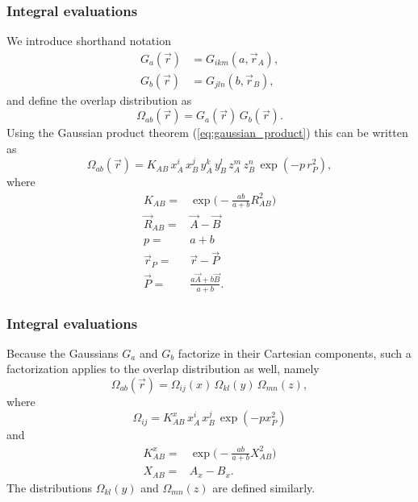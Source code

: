 \frame
{
  \frametitle{Integral evaluations}
\begin{small}
{\scriptsize
We introduce  shorthand notation
\begin{align}
  G_a(\vec r) & = G_{ikm}(a, \vec r_A), \\
  G_b(\vec r) & = G_{jln}(b, \vec r_B),
\end{align}
and define the overlap distribution  as
\begin{equation}
 \Omega_{ab}(\vec r) = G_a(\vec r)\,G_b(\vec r).
\end{equation}
Using the Gaussian product theorem (\ref{eq:gaussian_product}) this can be written as
\begin{equation}
 \Omega_{ab}(\vec r) = K_{AB}\,x^i_A\,x^j_B\,y^k_A\,y^l_B\,z^m_A\,z^n_B\,\exp(-p\,r^2_P),
\end{equation}
where
\begin{equation}
 \begin{split}
  K_{AB}  = & \exp\Big(-\frac{ab}{a + b}R^2_{AB}\Big) \\
  \vec R_{AB} = &  \vec A - \vec B \\
  p = & a + b\\
  \vec r_P = & \vec r - \vec P \\
  \vec P = & \frac{a\vec A + b\vec B}{a + b}.
 \end{split}
\end{equation}
}
\end{small}
}
\frame
{
  \frametitle{Integral evaluations}
\begin{small}
{\scriptsize
Because the Gaussians $G_a$ and $G_b$ factorize in their Cartesian components, such a factorization applies to the overlap distribution
as well, namely
\begin{equation}
 \Omega_{ab}(\vec r) = \Omega_{ij}(x)\,\Omega_{kl}(y)\,\Omega_{mn}(z),
\end{equation}
where
\begin{equation}
 \Omega_{ij} = K^x_{AB}\,x^i_A\,x^j_B\,\exp(-px^2_P)
\end{equation}
and
\begin{equation}
\begin{split}
 K^x_{AB} = & \exp\Big(-\frac{ab}{a + b}X^2_{AB}\Big) \\
   X_{AB} = & A_x - B_x.
\end{split}
\end{equation}
The distributions $\Omega_{kl}(y)$ and $\Omega_{mn}(z)$ are defined similarly.
}
\end{small}
}

